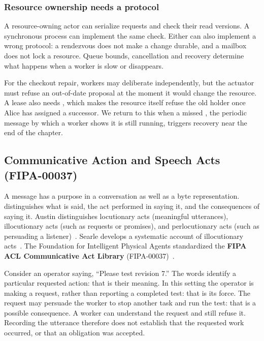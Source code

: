 \subsubsection{Resource ownership needs a protocol}
\label{sec:why-concurrency-matters}
A resource-owning actor can serialize requests and check their read versions.
A synchronous process can implement the same check. Either can also implement
a wrong protocol: a rendezvous does not make a change durable, and a mailbox
does not lock a resource. Queue bounds, cancellation and recovery determine
what happens when a worker is slow or disappears.

For the checkout repair, workers may deliberate independently, but the
actuator must refuse an out-of-date proposal at the moment it would change the
resource. A lease also needs , which makes the resource itself
refuse the old holder once Alice has assigned a successor. We return to this
when a missed , the periodic message by which a worker shows
it is still running, triggers recovery near the end of the chapter.

\subsection{Communicative Action and Speech Acts (FIPA-00037)}

A message has a purpose in a conversation as well as a byte representation.  distinguishes what is said, the act performed in saying it, and the consequences of saying it. Austin distinguishes locutionary acts (meaningful utterances), illocutionary acts (such as requests or promises), and perlocutionary acts (such as persuading a listener)~. Searle develops a systematic account of illocutionary acts~. The Foundation for Intelligent Physical Agents standardized the \textbf{FIPA ACL Communicative Act Library} (FIPA-00037)~.

Consider an operator saying, ``Please test revision 7.'' The words identify a
particular requested action: that is their meaning. In this setting the
operator is making a request, rather than reporting a completed test: that is
its force. The request may persuade the worker to stop another task and run
the test: that is a possible consequence. A worker can understand the request
and still refuse it. Recording the utterance therefore does not establish
that the requested work occurred, or that an obligation was accepted.

